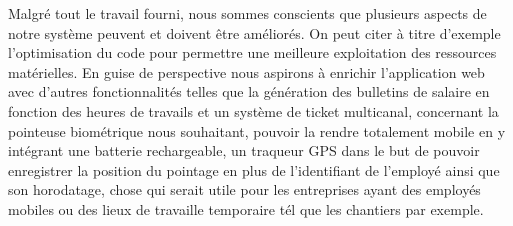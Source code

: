 Malgré tout le travail fourni, nous sommes conscients que plusieurs aspects de notre système peuvent et doivent être améliorés. On peut citer à titre d'exemple l'optimisation du code pour permettre une meilleure exploitation des ressources matérielles.
En guise de perspective nous aspirons à enrichir l'application web avec d'autres fonctionnalités telles que la génération des bulletins de salaire en fonction des heures de travails et un système de ticket multicanal, concernant la pointeuse biométrique nous souhaitant, pouvoir la rendre totalement mobile en y intégrant une batterie rechargeable, un traqueur GPS dans le but de pouvoir enregistrer la position du pointage en plus de l'identifiant de l'employé ainsi que son horodatage, chose qui serait utile pour les entreprises ayant des employés mobiles ou des lieux de travaille temporaire tél que les chantiers par exemple.  

